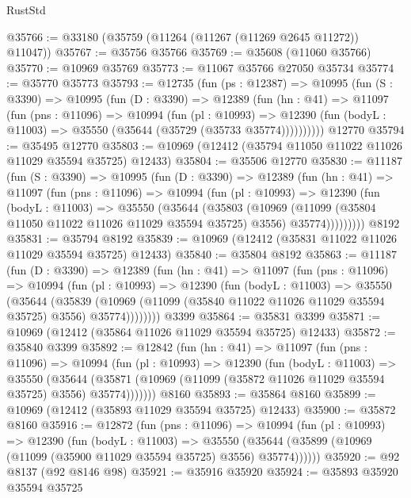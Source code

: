 \begin{lexlean}{RustStd}
\begin{coremodule}
@35766 := @33180 (@35759 (@11264 (@11267 (@11269 @2645 @11272)) @11047))
@35767 := @35756 @35766
@35769 := @35608 (@11060 @35766)
@35770 := @10969 @35769
@35773 := @11067 @35766 @27050 @35734
@35774 := @35770 @35773
@35793 := @12735
    (fun (ps : @12387) =>
    @10995
      (fun (S : @3390) =>
      @10995
        (fun (D : @3390) =>
        @12389
          (fun (hn : @41) =>
          @11097
            (fun (pns : @11096) =>
            @10994
              (fun (pl : @10993) =>
              @12390 (fun (bodyL : @11003) => @35550 (@35644 (@35729 (@35733 @35774))))))))))
    @12770
@35794 := @35495 @12770
@35803 := @10969 (@12412 (@35794 @11050 @11022 @11026 @11029 @35594 @35725) @12433)
@35804 := @35506 @12770
@35830 := @11187
    (fun (S : @3390) =>
    @10995
      (fun (D : @3390) =>
      @12389
        (fun (hn : @41) =>
        @11097
          (fun (pns : @11096) =>
          @10994
            (fun (pl : @10993) =>
            @12390
              (fun (bodyL : @11003) =>
              @35550
                (@35644
                  (@35803
                    (@10969
                      (@11099 (@35804 @11050 @11022 @11026 @11029 @35594 @35725) @3556)
                      @35774)))))))))
    @8192
@35831 := @35794 @8192
@35839 := @10969 (@12412 (@35831 @11022 @11026 @11029 @35594 @35725) @12433)
@35840 := @35804 @8192
@35863 := @11187
    (fun (D : @3390) =>
    @12389
      (fun (hn : @41) =>
      @11097
        (fun (pns : @11096) =>
        @10994
          (fun (pl : @10993) =>
          @12390
            (fun (bodyL : @11003) =>
            @35550
              (@35644
                (@35839
                  (@10969 (@11099 (@35840 @11022 @11026 @11029 @35594 @35725) @3556) @35774))))))))
    @3399
@35864 := @35831 @3399
@35871 := @10969 (@12412 (@35864 @11026 @11029 @35594 @35725) @12433)
@35872 := @35840 @3399
@35892 := @12842
    (fun (hn : @41) =>
    @11097
      (fun (pns : @11096) =>
      @10994
        (fun (pl : @10993) =>
        @12390
          (fun (bodyL : @11003) =>
          @35550
            (@35644
              (@35871 (@10969 (@11099 (@35872 @11026 @11029 @35594 @35725) @3556) @35774)))))))
    @8160
@35893 := @35864 @8160
@35899 := @10969 (@12412 (@35893 @11029 @35594 @35725) @12433)
@35900 := @35872 @8160
@35916 := @12872
    (fun (pns : @11096) =>
    @10994
      (fun (pl : @10993) =>
      @12390
        (fun (bodyL : @11003) =>
        @35550 (@35644 (@35899 (@10969 (@11099 (@35900 @11029 @35594 @35725) @3556) @35774))))))
@35920 := @92 @8137 (@92 @8146 @98)
@35921 := @35916 @35920
@35924 := @35893 @35920 @35594 @35725

\end{coremodule}
\end{lexlean}
